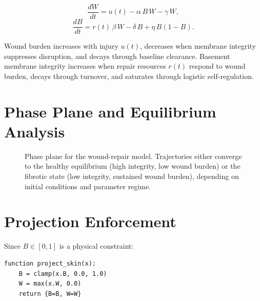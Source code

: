 \documentclass[12pt,openany]{book}
\begin{document}
\[
  \frac{dW}{dt} = u(t) - \alpha\,B\,W - \gamma\,W,
\]
\[
  \frac{dB}{dt} = r(t)\,\beta\,W - \delta\,B + \eta\,B(1-B).
\]

Wound burden increases with injury $u(t)$, decreases when membrane integrity
suppresses disruption, and decays through baseline clearance. Basement membrane
integrity increases when repair resources $r(t)$ respond to wound burden,
decays through turnover, and saturates through logistic self-regulation.

\section{Phase Plane and Equilibrium Analysis}

\begin{figure}[H]
\centering
{}
\caption{Phase plane for the wound-repair model. Trajectories either converge
to the healthy equilibrium (high integrity, low wound burden) or the fibrotic
state (low integrity, sustained wound burden), depending on initial conditions
and parameter regime.}
\label{fig:wound-phase}
\end{figure}

\section{Projection Enforcement}

Since $B\in[0,1]$ is a physical constraint:

\begin{pseudocode}
\begin{lstlisting}
function project_skin(x):
    B = clamp(x.B, 0.0, 1.0)
    W = max(x.W, 0.0)
    return {B=B, W=W}
\end{lstlisting}
\end{pseudocode}
\end{document}
